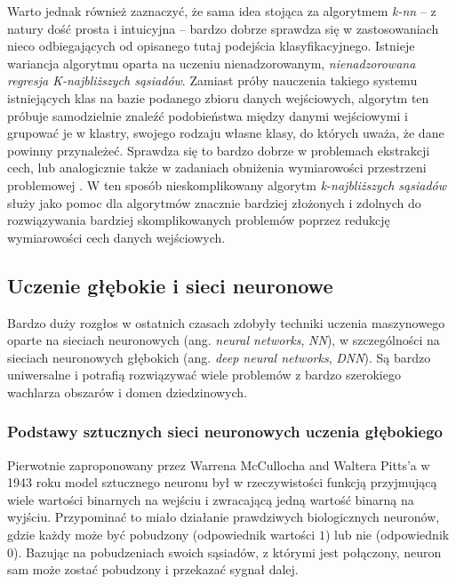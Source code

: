 \begin{itemize}
        Warto jednak również zaznaczyć, że sama idea stojąca za algorytmem \emph{k-nn} -- z natury dość prosta i intuicyjna -- bardzo dobrze sprawdza się w zastosowaniach nieco odbiegających od opisanego tutaj podejścia klasyfikacyjnego.
        Istnieje wariancja algorytmu oparta na uczeniu nienadzorowanym, \emph{nienadzorowana regresja K-najbliższych sąsiadów}.
        Zamiast próby nauczenia takiego systemu istniejących klas na bazie podanego zbioru danych wejściowych, algorytm ten próbuje samodzielnie znaleźć podobieństwa między danymi wejściowymi i grupować je w klastry, swojego rodzaju własne klasy, do których uważa, że dane powinny przynależeć.
        Sprawdza się to bardzo dobrze w problemach ekstrakcji cech, lub analogicznie także w zadaniach obniżenia wymiarowości przestrzeni problemowej \cite{wang2015accelerating}.
        W ten sposób nieskomplikowany algorytm \emph{k-najbliższych sąsiadów} służy jako pomoc dla algorytmów znacznie bardziej złożonych i zdolnych do rozwiązywania bardziej skomplikowanych problemów poprzez redukcję wymiarowości cech danych wejściowych.

\end{itemize}

\label{sec:deep-learning}
\subsection{Uczenie głębokie i sieci neuronowe}

Bardzo duży rozgłos w ostatnich czasach zdobyły techniki uczenia maszynowego oparte na sieciach neuronowych (ang. \emph{neural networks}, \emph{NN}), w szczególności na sieciach neuronowych głębokich (ang. \emph{deep neural networks}, \emph{DNN}).
Są bardzo uniwersalne i potrafią rozwiązywać wiele problemów z bardzo szerokiego wachlarza obszarów i domen dziedzinowych.

\subsubsection{Podstawy sztucznych sieci neuronowych uczenia głębokiego}

Pierwotnie zaproponowany przez Warrena McCullocha and Waltera Pitts'a w 1943 roku \cite{mcculloch1943logical} model sztucznego neuronu był w rzeczywistości funkcją przyjmującą wiele wartości binarnych na wejściu i zwracającą jedną wartość binarną na wyjściu.
Przypominać to miało działanie prawdziwych biologicznych neuronów, gdzie każdy może być pobudzony (odpowiednik wartości $1$) lub nie (odpowiednik $0$).
Bazując na pobudzeniach swoich sąsiadów, z którymi jest połączony, neuron sam może zostać pobudzony i przekazać sygnał dalej.

